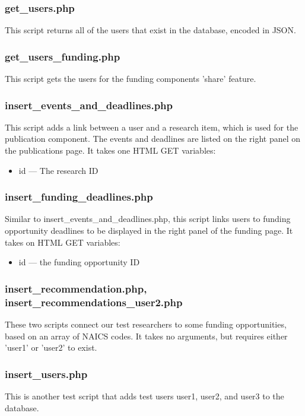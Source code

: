 \documentclass[onecolumn]{IEEEtran}
\begin{document}
\subsubsection{get\_users.php}
This script returns all of the users that exist in the database, encoded in JSON. 

\subsubsection{get\_users\_funding.php}
This script gets the users for the funding components 'share' feature. 

\subsubsection{insert\_events\_and\_deadlines.php}
This script adds a link between a user and a research item, which is used for the publication component. The events and deadlines are listed on the right panel on the publications page. It takes one HTML GET variables: 
\begin{itemize}
    \item id --- The research ID 
\end{itemize}    

\subsubsection{insert\_funding\_deadlines.php}
Similar to insert\_events\_and\_deadlines.php, this script links users to funding opportunity deadlines to be displayed in the right panel of the funding page. It takes on HTML GET variables: 
\begin{itemize}
    \item id ---  the funding opportunity ID 
\end{itemize}    

\subsubsection{insert\_recommendation.php, insert\_recommendations\_user2.php}
These two scripts connect our test researchers to some funding opportunities, based on an array of NAICS codes. It takes no arguments, but requires either 'user1' or 'user2' to exist. 

\subsubsection{insert\_users.php}
This is another test script that adds test users user1, user2, and user3 to the database. 
\end{document}

